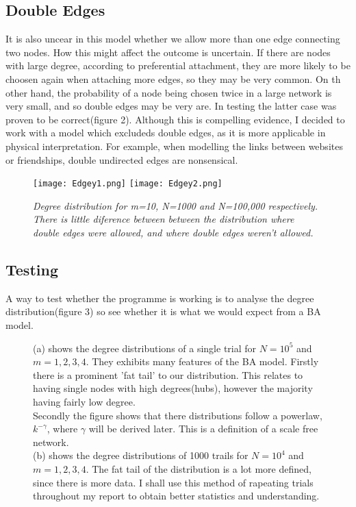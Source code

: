 \documentclass[]{article}
\begin{document}
\subsection{Double Edges}
It is also uncear in this model whether we allow more than one edge connecting two nodes. How this might affect the outcome is uncertain. If there are nodes with large degree, according to preferential attachment, they are more likely to be choosen again when attaching more edges, so they may be very common. On th other hand, the probability of a node being chosen twice in a large network is very small, and so double edges may be very are.  In testing the latter case was proven to be correct(figure 2). Although this is compelling evidence, I decided to work with a model which excludeds double edges, as it is more applicable in physical interpretation. For example, when modelling the links between websites or friendships, double undirected edges are nonsensical. 
\begin{figure}[htp]
	\centering
	\texttt{[image: Edgey1.png]}\hfill
	\texttt{[image: Edgey2.png]}\hfill
	\caption{\textit{Degree distribution for m=10, N=1000 and N=100,000 respectively. There is little diference between between the distribution where double edges were allowed, and where double edges weren't allowed. }}
\end{figure}
\subsection{Testing}
A way to test whether the programme is working is to analyse the degree distribution(figure 3) so see whether it is what we would expect from a BA model.
\begin{figure}[H]
 	\caption{(a) shows the degree distributions of a single trial for $N=10^5$ and $m=1,2,3,4$. They exhibits many features of the BA model. Firstly there is a prominent 'fat tail' to our distribution. This relates to having single nodes with high degrees(hubs), however the majority having fairly low degree. \\
 	Secondly the figure shows that there distributions follow a powerlaw, $k^{-\gamma}$, where $\gamma$ will be derived later. This is a definition of a scale free network. \\
 	(b) shows the degree distributions of 1000 trails for $N=10^4$ and $m=1,2,3,4$. The fat tail of the distribution is a lot more defined, since there is more data. I shall use this method of rapeating trials throughout my report to obtain better statistics and understanding.}
\end{figure}
\end{document}
